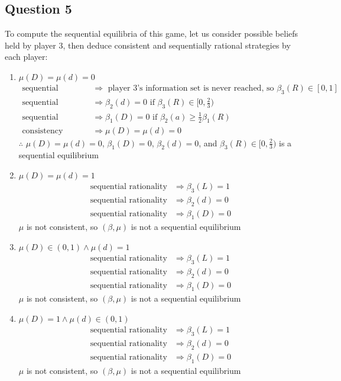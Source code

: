 \documentclass{article}
\begin{document}
\subsection*{Question 5}
To compute the sequential equilibria of this game, let us consider possible beliefs held by player 3, then deduce consistent and sequentially rational strategies by each player:
\begin{enumerate}
	\item $\mu(D) = \mu(d) = 0$
		\begin{align*}
			\text{sequential rationality} 	&\Rightarrow \text{ player 3's information set is never reached, so }\beta_3(R)\in[0,1] \\
			\text{sequential rationality} 	&\Rightarrow \beta_2(d) = 0	\text{ if }\beta_3(R)\in[0,\frac{2}{3})\\
			\text{sequential rationality} 	&\Rightarrow \beta_1(D) = 0 \text{ if }\beta_2(a)\geq\frac{1}{2}\beta_1(R)	\\
			\text{consistency}				&\Rightarrow \mu(D) = \mu(d) = 0	
		\end{align*}
		$\therefore$ ${\mu(D) = \mu(d) = 0}$, ${\beta_1(D)=0}$, ${\beta_2(d)=0}$, and ${\beta_3(R)\in[0,\frac{2}{3})}$ is a sequential equilibrium 
		
	\item $\mu(D) = \mu(d) = 1$
		\begin{align*}
			\text{sequential rationality} 	&\Rightarrow \beta_3(L) = 1	\\
			\text{sequential rationality} 	&\Rightarrow \beta_2(d) = 0	\\
			\text{sequential rationality} 	&\Rightarrow \beta_1(D) = 0	
		\end{align*}
		$\mu$ is not consistent, so $(\beta,\mu)$ is not a sequential equilibrium
		
	\item $\mu(D)\in(0,1)\land \mu(d) = 1$
		\begin{align*}
			\text{sequential rationality} 	&\Rightarrow \beta_3(L) = 1	\\
			\text{sequential rationality} 	&\Rightarrow \beta_2(d) = 0	\\
			\text{sequential rationality} 	&\Rightarrow \beta_1(D) = 0	
		\end{align*}
		$\mu$ is not consistent, so $(\beta,\mu)$ is not a sequential equilibrium
		
	\item $\mu(D) = 1\land \mu(d)\in(0,1)$
		\begin{align*}
			\text{sequential rationality} 	&\Rightarrow \beta_3(L) = 1	\\
			\text{sequential rationality} 	&\Rightarrow \beta_2(d) = 0	\\
			\text{sequential rationality} 	&\Rightarrow \beta_1(D) = 0	
		\end{align*}
		$\mu$ is not consistent, so $(\beta,\mu)$ is not a sequential equilibrium
		

\end{enumerate}
\end{document}
